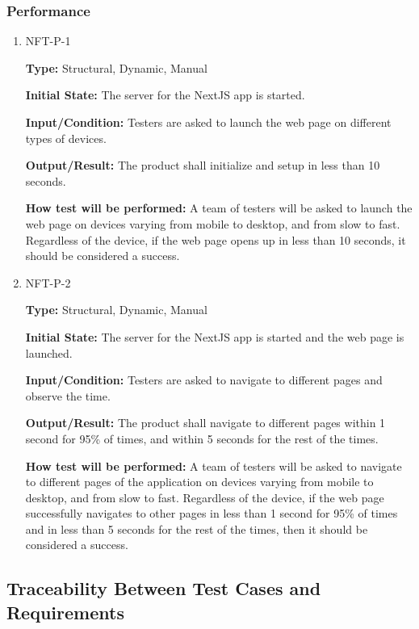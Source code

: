 \documentclass[12pt, titlepage]{article}
\begin{document}
\subsubsection{Performance}

\begin{enumerate}

\item{NFT-P-1}

\textbf{Type:} Structural, Dynamic, Manual

\textbf{Initial State:} The server for the NextJS app is started.
    
\textbf{Input/Condition:} Testers are asked to launch the web page on different types of devices.

\textbf{Output/Result:} The product shall initialize and setup in less than 10 seconds.

\textbf{How test will be performed:} A team of testers will be asked to launch the web page on devices varying from mobile to desktop, and from slow to fast. Regardless of the device, if the web page opens up in less than 10 seconds, it should be considered a success.
				
\item{NFT-P-2}

\textbf{Type:} Structural, Dynamic, Manual

\textbf{Initial State:} The server for the NextJS app is started and the web page is launched.
    
\textbf{Input/Condition:} Testers are asked to navigate to different pages and observe the time.

\textbf{Output/Result:} The product shall navigate to different pages within 1 second for 95\% of times, and within 5 seconds for the rest of the times.

\textbf{How test will be performed:} A team of testers will be asked to navigate to different pages of the application on devices varying from mobile to desktop, and from slow to fast. Regardless of the device, if the web page successfully navigates to other pages in less than 1 second for 95\% of times and in less than 5 seconds for the rest of the times, then it should be considered a success.
\end{enumerate}


\subsection{Traceability Between Test Cases and Requirements}
\end{document}
